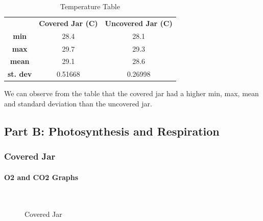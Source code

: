 \documentclass[a4paper, 12pt, english]{article}
\begin{document}
\begin{table}[H]
	\caption{\label{tab:Table 1} Temperature Table}
	\centering
	\begin{tabular}{c c c}
		\toprule
		                 & \textbf{Covered Jar (\degree C)}
		                 & \textbf{Uncovered Jar (\degree C)}           \\
		\cmidrule[0.4pt](r{0.125em}){1-1}%
		\cmidrule[0.4pt](lr{0.125em}){2-2}%
		\cmidrule[0.4pt](lr{0.125em}){3-3}%
		\textbf{min}     & 28.4                               & 28.1    \\
		\textbf{max}     & 29.7                               & 29.3    \\
		\textbf{mean}    & 29.1                               & 28.6    \\
		\textbf{st. dev} & 0.51668                            & 0.26998
	\end{tabular}
\end{table}

We can observe from the table that the covered jar had a higher min, max, mean
and standard deviation than the uncovered jar.

\subsection{Part B: Photosynthesis and Respiration}
\subsubsection{Covered Jar}
\paragraph{O2 and CO2 Graphs}
\begin{figure}[H]
	\centering
	\\
	\qquad
	\qquad
	\caption{Covered Jar}
	\label{fig:CoveredJar}
\end{figure}
\end{document}
